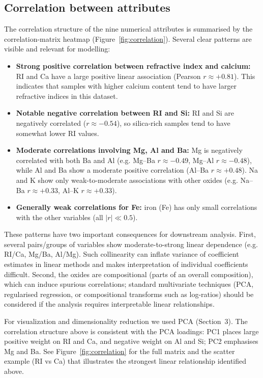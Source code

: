 \documentclass[dtu]{dtuarticle}
\begin{document}
	\subsection{Correlation between attributes}

	The correlation structure of the nine numerical attributes is summarised by the correlation-matrix
	heatmap (Figure~\ref{fig:correlation}).  Several clear patterns are visible and relevant for modelling:
	
	\begin{itemize}
	  \item \textbf{Strong positive correlation between refractive index and calcium:} RI and Ca have a large
	    positive linear association (Pearson $r \approx +0.81$). This indicates that samples with higher
	    calcium content tend to have larger refractive indices in this dataset.
	  \item \textbf{Notable negative correlation between RI and Si:} RI and Si are negatively correlated
	    ($r \approx -0.54$), so silica-rich samples tend to have somewhat lower RI values.
	  \item \textbf{Moderate correlations involving Mg, Al and Ba:} Mg is negatively correlated with both Ba
	    and Al (e.g. Mg--Ba $r\approx -0.49$, Mg--Al $r\approx -0.48$), while Al and Ba show a moderate
	    positive correlation (Al--Ba $r\approx +0.48$). Na and K show only weak-to-moderate associations
	    with other oxides (e.g. Na--Ba $r\approx +0.33$, Al--K $r\approx +0.33$).
	  \item \textbf{Generally weak correlations for Fe:} iron (Fe) has only small correlations with the other
	    variables (all $|r| \ll 0.5$).
	\end{itemize}
	
	These patterns have two important consequences for downstream analysis. First, several pairs/groups of
	variables show moderate-to-strong linear dependence (e.g. RI/Ca, Mg/Ba, Al/Mg). Such collinearity can
	inflate variance of coefficient estimates in linear methods and makes interpretation of individual
	coefficients difficult. Second, the oxides are compositional (parts of an overall composition), which
	can induce spurious correlations; standard multivariate techniques (PCA, regularised regression, or
	compositional transforms such as log-ratios) should be considered if the analysis requires interpretable
	linear relationships.
	
	For visualization and dimensionality reduction we used PCA (Section~3).  The correlation structure above
	is consistent with the PCA loadings: PC1 places large positive weight on RI and Ca, and negative weight
	on Al and Si; PC2 emphasises Mg and Ba.  See Figure~\ref{fig:correlation} for the full matrix and the
	scatter example (RI vs Ca) that illustrates the strongest linear relationship identified above.
\end{document}

